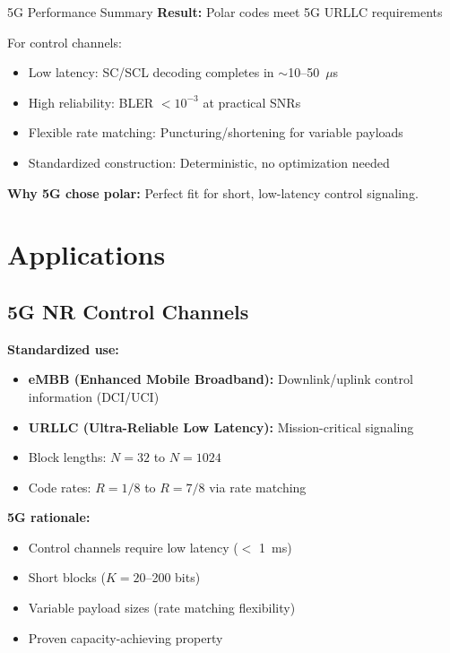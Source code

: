 \begin{calloutbox}[colback=black!8!white,colframe=black]{5G Performance Summary}
\textbf{Result:} Polar codes meet 5G URLLC requirements

For control channels:
\begin{itemize}
\item Low latency: SC/SCL decoding completes in $\sim$10--50~$\mu$s
\item High reliability: BLER $< 10^{-3}$ at practical SNRs
\item Flexible rate matching: Puncturing/shortening for variable payloads
\item Standardized construction: Deterministic, no optimization needed
\end{itemize}

\textbf{Why 5G chose polar:} Perfect fit for short, low-latency control signaling.
\end{calloutbox}

\section{Applications}

\subsection{5G NR Control Channels}

\textbf{Standardized use:}
\begin{itemize}
\item \textbf{eMBB (Enhanced Mobile Broadband):} Downlink/uplink control information (DCI/UCI)
\item \textbf{URLLC (Ultra-Reliable Low Latency):} Mission-critical signaling
\item Block lengths: $N = 32$ to $N = 1024$
\item Code rates: $R = 1/8$ to $R = 7/8$ via rate matching
\end{itemize}

\textbf{5G rationale:}
\begin{itemize}
\item Control channels require low latency ($<$ 1~ms)
\item Short blocks ($K = 20$--200 bits)
\item Variable payload sizes (rate matching flexibility)
\item Proven capacity-achieving property
\end{itemize}

